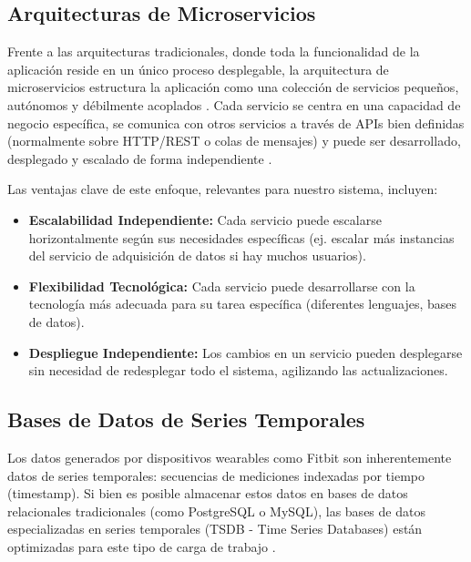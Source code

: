 \subsection{Arquitecturas de Microservicios}
\label{subsec:ea_microservicios}

Frente a las arquitecturas tradicionales, donde toda la funcionalidad de la aplicación reside en un único proceso desplegable, la arquitectura de microservicios estructura la aplicación como una colección de servicios pequeños, autónomos y débilmente acoplados \cite{fowler_microservices}. Cada servicio se centra en una capacidad de negocio específica, se comunica con otros servicios a través de APIs bien definidas (normalmente sobre HTTP/REST o colas de mensajes) y puede ser desarrollado, desplegado y escalado de forma independiente \cite{newman_building_microservices}.

Las ventajas clave de este enfoque, relevantes para nuestro sistema, incluyen:
\begin{itemize}
    \item \textbf{Escalabilidad Independiente:} Cada servicio puede escalarse horizontalmente según sus necesidades específicas (ej. escalar más instancias del servicio de adquisición de datos si hay muchos usuarios).
    \item \textbf{Flexibilidad Tecnológica:} Cada servicio puede desarrollarse con la tecnología más adecuada para su tarea específica (diferentes lenguajes, bases de datos).
    \item \textbf{Despliegue Independiente:} Los cambios en un servicio pueden desplegarse sin necesidad de redesplegar todo el sistema, agilizando las actualizaciones.
\end{itemize}

\subsection{Bases de Datos de Series Temporales}
\label{subsec:ea_db_timeseries}

Los datos generados por dispositivos wearables como Fitbit\textsuperscript{\textregistered} son inherentemente datos de series temporales: secuencias de mediciones indexadas por tiempo (timestamp). Si bien es posible almacenar estos datos en bases de datos relacionales tradicionales (como PostgreSQL o MySQL), las bases de datos especializadas en series temporales (TSDB - Time Series Databases) están optimizadas para este tipo de carga de trabajo \cite{dbengines_timeseries_ranking}.

